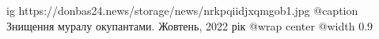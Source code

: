  
 
 
 
 

\ifcmt
  ig https://donbas24.news/storage/news/nrkpqiidjxqmgob1.jpg
	@caption Знищення муралу окупантами. Жовтень, 2022 рік
  @wrap center
  @width 0.9
\fi
